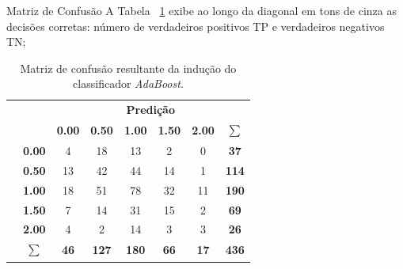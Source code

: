 \documentclass[10pt]{beamer}
\newcommand*\rot{\rotatebox{90}}
\begin{document}
  \begin{frame}[fragile]{Matriz de Confusão}
    A Tabela ~\ref{tab:matrix_confusion} exibe ao longo da diagonal em tons de cinza as decisões corretas: número de verdadeiros positivos TP e verdadeiros negativos TN;

    \begin{table}[H]
    \centering
    \begin{tabular}{cc|c|c|c|c|c|c|}
    \cline{3-8}
     &  & \multicolumn{6}{c|}{\textbf{Predição}} \\ \cline{3-8} 
     &  & \textbf{0.00} & \textbf{0.50} & \textbf{1.00} & \textbf{1.50} & \textbf{2.00} & $\sum_{}$  \\ \hline
    \multicolumn{1}{|c|}{} & \textbf{0.00} & \cellcolor[HTML]{C0C0C0}4 & 18 & 13 & 2 & 0 & \textbf{37} \\ \cline{2-8} 
    \multicolumn{1}{|c|}{} & \textbf{0.50} & 13 & \cellcolor[HTML]{C0C0C0}42 & 44 & 14 & 1 & \textbf{114} \\ \cline{2-8} 
    \multicolumn{1}{|c|}{} & \textbf{1.00} & 18 & 51 & \cellcolor[HTML]{C0C0C0}78 & 32 & 11 & \textbf{190} \\ \cline{2-8} 
    \multicolumn{1}{|c|}{} & \textbf{1.50} & 7 & 14 & 31 & \cellcolor[HTML]{C0C0C0}15 & 2 & \textbf{69} \\ \cline{2-8} 
    \multicolumn{1}{|c|}{} & \textbf{2.00} & 4 & 2 & 14 & 3 & \cellcolor[HTML]{C0C0C0}3 & \textbf{26} \\ \cline{2-8} 
    \multicolumn{1}{|c|}{\multirow{-6}{*}{\rot{Atual}}} & $\sum_{}$ & \textbf{46} & \textbf{127} & \textbf{180} & \textbf{66} & \textbf{17} & \textbf{436} \\ \hline
    \end{tabular}
    \caption{Matriz de confusão resultante da indução do classificador \textit{AdaBoost}.}
    \label{tab:matrix_confusion}
    \end{table}
  
  \end{frame}
\end{document}
